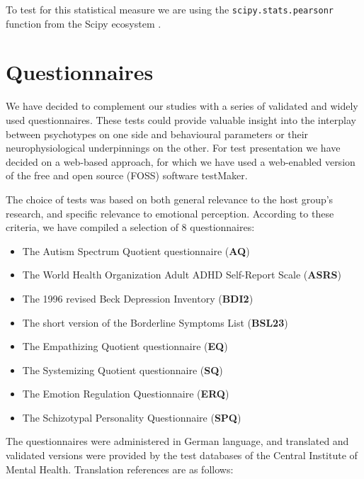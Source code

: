 	    To test for this statistical measure we are using the \colorbox{vlg}{\texttt{scipy.stats.pearsonr}} function from the Scipy ecosystem \citep{scipy,Oliphant2007}. 
    \section{Questionnaires}
	We have decided to complement our studies with a series of validated and widely used questionnaires.
	These tests could provide valuable insight into the interplay between psychotypes on one side and behavioural parameters or their neurophysiological underpinnings on the other.
	For test presentation we have decided on a web-based approach, for which we have used a web-enabled version of the free and open source (FOSS) software testMaker\citep{testmaker}.
	
	The choice of tests was based on both general relevance to the host group's research, and specific relevance to emotional perception.
	According to these criteria, we have compiled a selection of 8 questionnaires:
	\begin{itemize}
	    \item The Autism Spectrum Quotient questionnaire (\textbf{AQ}) \citep{Baron-Cohen2001}
	    \item The World Health Organization Adult ADHD Self-Report Scale (\textbf{ASRS}) \citep{Kessler2005}
	    \item The 1996 revised Beck Depression Inventory (\textbf{BDI2}) \citep{Beck1996}
	    \item The short version of the Borderline Symptoms List (\textbf{BSL23}) \citep{Bohus2009}
	    \item The Empathizing Quotient questionnaire (\textbf{EQ}) \citep{Baron-Cohen2004}
	    \item The Systemizing Quotient questionnaire (\textbf{SQ}) \citep{Baron-Cohen2003a}
	    \item The Emotion Regulation Questionnaire (\textbf{ERQ}) \citep{Gross2003}
	    \item The Schizotypal Personality Questionnaire (\textbf{SPQ}) \citep{Raine1991}
	\end{itemize}
	The questionnaires were administered in German language, and translated and validated versions were provided by the test databases of the Central Institute of Mental Health.
	Translation references are as follows:
